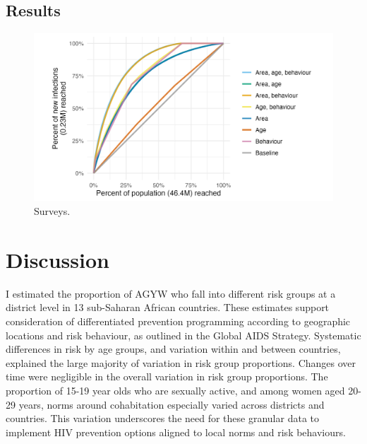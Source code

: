 \documentclass[a4paper, nobind]{templates/ociamthesis}
\begin{document}
\hypertarget{results-1}{%
\subsection{Results}\label{results-1}}

\begin{figure}

{\centering \includegraphics[width=0.9\linewidth]{resources/multi-agyw/20230627-144735-3da88508/depends/infections-reached} 

}

\caption{Surveys.}\label{fig:infections-reached}
\end{figure}

\hypertarget{discussion-1}{%
\section{Discussion}\label{discussion-1}}

I estimated the proportion of AGYW who fall into different risk groups at a district level in 13 sub-Saharan African countries.
These estimates support consideration of differentiated prevention programming according to geographic locations and risk behaviour, as outlined in the Global AIDS Strategy.
Systematic differences in risk by age groups, and variation within and between countries, explained the large majority of variation in risk group proportions.
Changes over time were negligible in the overall variation in risk group proportions.
The proportion of 15-19 year olds who are sexually active, and among women aged 20-29 years, norms around cohabitation especially varied across districts and countries.
This variation underscores the need for these granular data to implement HIV prevention options aligned to local norms and risk behaviours.
\end{document}
